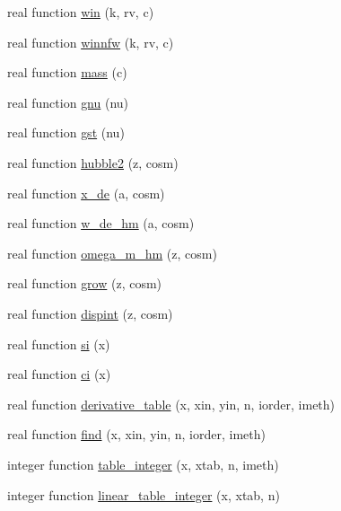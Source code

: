 \begin{DoxyCompactItemize}
real function \mbox{\hyperlink{namespacenonlinear_a35d90b214ebbc4ed47ee2a0b00533081}{win}} (k, rv, c)
\item 
real function \mbox{\hyperlink{namespacenonlinear_ad0e2241407de1974edb07a5990f12ba3}{winnfw}} (k, rv, c)
\item 
real function \mbox{\hyperlink{namespacenonlinear_acce5a3564ba00c26a8a5674ab63d5b73}{mass}} (c)
\item 
real function \mbox{\hyperlink{namespacenonlinear_a236c113538d97686a8f8e286b29bc073}{gnu}} (nu)
\item 
real function \mbox{\hyperlink{namespacenonlinear_a5eea788fe3f505d256438cee66af3240}{gst}} (nu)
\item 
real function \mbox{\hyperlink{namespacenonlinear_a82f340c9a9b18e3f45b2ddbe518cebba}{hubble2}} (z, cosm)
\item 
real function \mbox{\hyperlink{namespacenonlinear_a316db4addf8f1f544ab3c08ba97fbeb9}{x\+\_\+de}} (a, cosm)
\item 
real function \mbox{\hyperlink{namespacenonlinear_acb781fcdfe31fdfcd54337c5fc827fb2}{w\+\_\+de\+\_\+hm}} (a, cosm)
\item 
real function \mbox{\hyperlink{namespacenonlinear_ac515b61587eefa54d1ebc904d0ef78b6}{omega\+\_\+m\+\_\+hm}} (z, cosm)
\item 
real function \mbox{\hyperlink{namespacenonlinear_a1870caf0d38a1c6617ca3ef8de2f6947}{grow}} (z, cosm)
\item 
real function \mbox{\hyperlink{namespacenonlinear_ae44a5c4f7412d42923e10f9a241d2e74}{dispint}} (z, cosm)
\item 
real function \mbox{\hyperlink{namespacenonlinear_a6171546fb42a0d5c085c3ee5c8662e0b}{si}} (x)
\item 
real function \mbox{\hyperlink{namespacenonlinear_a723581002925fb14e73f4d80ce6ee6e5}{ci}} (x)
\item 
real function \mbox{\hyperlink{namespacenonlinear_aaa7e906c253a54ffb73bab9e5dfd1397}{derivative\+\_\+table}} (x, xin, yin, n, iorder, imeth)
\item 
real function \mbox{\hyperlink{namespacenonlinear_a553c7b86e3fd7c044f3fcef5b77c0a3f}{find}} (x, xin, yin, n, iorder, imeth)
\item 
integer function \mbox{\hyperlink{namespacenonlinear_a9982a6cac80109ad36dd796e77f372de}{table\+\_\+integer}} (x, xtab, n, imeth)
\item 
integer function \mbox{\hyperlink{namespacenonlinear_a623980d65535bc78bbcf5eb8f701ac42}{linear\+\_\+table\+\_\+integer}} (x, xtab, n)

\end{DoxyCompactItemize}
